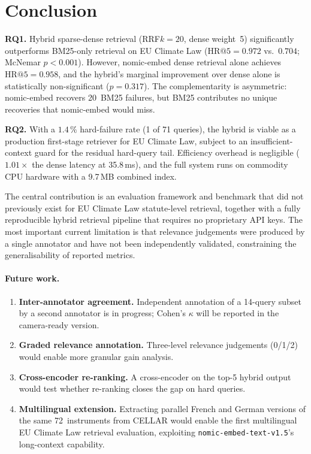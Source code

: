 \documentclass[sigconf,screen]{acmart}
\makeatletter
\newcommand{\HR}[1]{\mathrm{HR}@{#1}}
\newcommand{\nomic}{\texttt{nomic-embed-text-v1.5}\xspace}
\newcommand{\nomicshort}{nomic-embed\xspace}
\newcommand{\rrf}{RRF\xspace}
\makeatother
\begin{document}
\section{Conclusion}
\label{sec:conclusion}

\textbf{RQ1.}  Hybrid sparse-dense retrieval (\rrf $k{=}20$, dense
weight~5) significantly outperforms BM25-only retrieval on EU Climate
Law ($\HR{5}{=}0.972$ vs.\ $0.704$; McNemar $p{<}0.001$).  However,
\nomicshort dense retrieval alone achieves $\HR{5}{=}0.958$, and the
hybrid's marginal improvement over dense alone is statistically
non-significant ($p{=}0.317$).  The complementarity is asymmetric:
\nomicshort recovers 20~BM25 failures, but BM25 contributes no
unique recoveries that \nomicshort would miss.

\textbf{RQ2.}  With a $1.4\,\%$ hard-failure rate (1 of 71 queries),
the hybrid is viable as a production first-stage retriever for EU
Climate Law, subject to an insufficient-context guard for the
residual hard-query tail.  Efficiency overhead is negligible
($1.01\times$ the dense latency at 35.8\,ms), and the full system
runs on commodity CPU hardware with a 9.7\,MB combined index.

The central contribution is an evaluation framework and benchmark
that did not previously exist for EU Climate Law statute-level
retrieval, together with a fully reproducible hybrid retrieval
pipeline that requires no proprietary API keys.  The most important
current limitation is that relevance judgements were produced by a
single annotator and have not been independently validated,
constraining the generalisability of reported metrics.

\paragraph{Future work.}
\begin{enumerate}
  \item \textbf{Inter-annotator agreement.}  Independent annotation
    of a 14-query subset by a second annotator is in progress;
    Cohen's $\kappa$ will be reported in the camera-ready version.
  \item \textbf{Graded relevance annotation.}  Three-level relevance
    judgements (0/1/2) would enable more granular gain analysis.
  \item \textbf{Cross-encoder re-ranking.}  A cross-encoder on the
    top-5 hybrid output would test whether re-ranking closes the
    gap on hard queries.
  \item \textbf{Multilingual extension.}  Extracting parallel French
    and German versions of the same 72~instruments from CELLAR would
    enable the first multilingual EU Climate Law retrieval evaluation,
    exploiting \nomic's long-context capability.
\end{enumerate}
\end{document}
